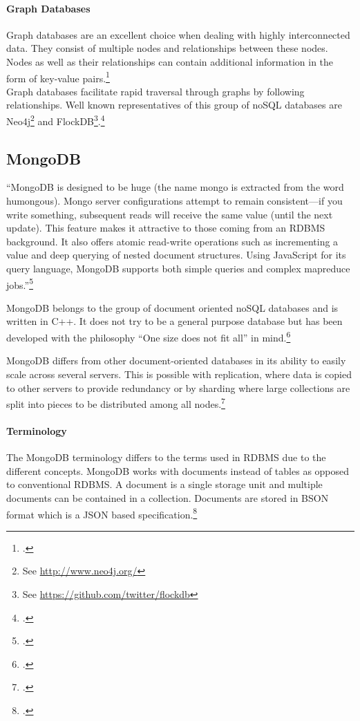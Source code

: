 \paragraph{Graph Databases}
\label{sec:nosql-graph}
Graph databases are an excellent choice when dealing with highly interconnected
data. They consist of multiple nodes and relationships between these nodes.
Nodes as well as their relationships can contain additional information in the
form of key-value pairs.\footcite[Cf.][6]{Redmond_2012}\\
Graph databases facilitate rapid traversal through graphs by following
relationships. Well known representatives of this group of noSQL databases are
Neo4j\footnote{See \url{http://www.neo4j.org/}} and FlockDB\footnote{See
\url{https://github.com/twitter/flockdb}}.\footcite[Cf.][19]{Tiwari_2011}


\subsection{MongoDB}
\label{sec:mongodb}


``MongoDB is designed to be huge (the name mongo is extracted from the word
humongous). Mongo server configurations attempt to remain consistent—if
you write something, subsequent reads will receive the same value (until the
next update). This feature makes it attractive to those coming from an RDBMS
background. It also offers atomic read-write operations such as incrementing
a value and deep querying of nested document structures. Using JavaScript
for its query language, MongoDB supports both simple queries and complex
mapreduce jobs.''\footcite[][6]{Redmond_2012}

MongoDB belongs to the group of document oriented noSQL databases and is written
in C++. It does not try to be a general purpose database but has been developed
with the philosophy ``One size does not fit all'' in mind.\footcite[Cf.][3]{Plugge_2010}

MongoDB differs from other document-oriented databases in its ability to easily
scale across several servers. This is possible with replication, where data is 
copied to other servers to provide redundancy or by sharding where large
collections are split into pieces to be distributed among all
nodes.\footcite[Cf.][165]{Redmond_2012}

\paragraph{Terminology}
The MongoDB terminology differs to the terms used in RDBMS due to the different
concepts. MongoDB works with documents instead of tables as opposed to conventional RDBMS.
A document is a single storage unit and multiple documents can be contained in a
collection. Documents are stored in BSON format which is a JSON based
specification.\footcite[Cf.][]{bson_spec}

